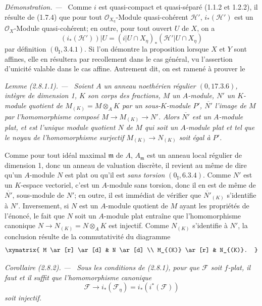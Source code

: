 \documentclass[10pt,oneside]{book}
\newenvironment{corollary}[1][]{%
  \par\medskip\noindent\itshape Corollaire (#1). ---\ }{\par}
\newenvironment{lemma}[1][]{%
  \par\medskip\noindent\itshape Lemme (#1). ---\ }{\par}
\newenvironment{proof}{%
  \par\medskip\noindent\textit{Démonstration. ---\ }}{\par}
\begin{document}
\begin{proof}
Comme $i$ est quasi-compact et quasi-séparé (1.1.2 et 1.2.2), il résulte de
(1.7.4) que pour tout $\mathcal O_{X_\eta}$-Module quasi-cohérent
$\mathcal H'$, $i_*(\mathcal H')$ est un $\mathcal O_X$-Module
quasi-cohérent; en outre, pour tout ouvert $U$ de $X$, on a
\[
(i_*(\mathcal H'))|U=(i|U\cap X_\eta)_*(\mathcal H'|U\cap X_\eta)
\]
par définition $(0_{\mathrm I},3.4.1)$. Si l'on démontre la proposition
lorsque $X$ et $Y$ sont affines, elle en résultera par recollement dans le cas
général, vu l'assertion d'unicité valable dans le cas affine. Autrement dit,
on est ramené à prouver le

\begin{lemma}[2.8.1.1]
\label{IV.2.8.1.1-fr}
Soient $A$ un anneau noethérien régulier $(0,17.3.6)$, intègre de dimension
1, $K$ son corps des fractions, $M$ un $A$-module, $N'$ un $K$-module
quotient de $M_{(K)}=M\otimes_A K$ par un sous-$K$-module $P'$,
$\overline{N'}$ l'image de $M$ par l'homomorphisme composé
$M\to M_{(K)}\to N'$. Alors $\overline{N'}$ est un $A$-module plat, et est
l'unique module quotient $N$ de $M$ qui soit un $A$-module plat et tel que le
noyau de l'homomorphisme surjectif $M_{(K)}\to N_{(K)}$ soit égal à $P'$.
\end{lemma}

Comme pour tout idéal maximal $\mathfrak m$ de $A$, $A_{\mathfrak m}$ est un
anneau local régulier de dimension 1, donc un anneau de valuation discrète,
il revient au même de dire qu'un $A$-module $N$ est plat ou qu'il est
\emph{sans torsion} $(0_{\mathrm I},6.3.4)$. Comme $N'$ est un $K$-espace
vectoriel, c'est un $A$-module sans torsion, donc il en est de même de
$\overline{N'}$, sous-module de $N'$; en outre, il est immédiat de vérifier
que $\overline{N'}_{(K)}$ s'identifie à $N'$. Inversement, si $N$ est un
$A$-module quotient de $M$ ayant les propriétés de l'énoncé, le fait que $N$
soit un $A$-module plat entraîne que l'homomorphisme canonique
$N\to N_{(K)}=N\otimes_A K$ est injectif. Comme $N_{(K)}$ s'identifie à
$N'$, la conclusion résulte de la commutativité du diagramme
\[
\xymatrix{
M \ar[r] \ar[d] & N \ar[d] \\
M_{(K)} \ar[r] & N_{(K)}.
}
\]
\end{proof}

\begin{corollary}[2.8.2]
\label{IV.2.8.2-fr}
Sous les conditions de (2.8.1), pour que $\mathcal F$ soit $f$-plat, il faut
et il suffit que l'homomorphisme canonique
\[
\mathcal F\longrightarrow i_*(\mathcal F_\eta)=i_*(i^*(\mathcal F))
\]
soit injectif.
\end{corollary}
\end{document}

